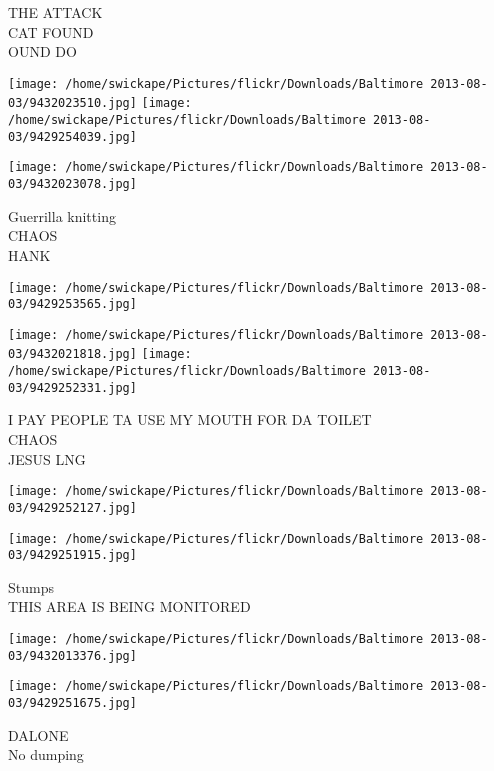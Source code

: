 \documentclass[10pt,letterpaper]{article}
\begin{document}
THE ATTACK\\
CAT FOUND\\
OUND DO\\
\pagebreak

\texttt{[image: /home/swickape/Pictures/flickr/Downloads/Baltimore 2013-08-03/9432023510.jpg]}
\texttt{[image: /home/swickape/Pictures/flickr/Downloads/Baltimore 2013-08-03/9429254039.jpg]}

\texttt{[image: /home/swickape/Pictures/flickr/Downloads/Baltimore 2013-08-03/9432023078.jpg]}

Guerrilla knitting\\
CHAOS\\
HANK\\
\pagebreak

\texttt{[image: /home/swickape/Pictures/flickr/Downloads/Baltimore 2013-08-03/9429253565.jpg]}

\vspace{0.25in}
\texttt{[image: /home/swickape/Pictures/flickr/Downloads/Baltimore 2013-08-03/9432021818.jpg]}
\texttt{[image: /home/swickape/Pictures/flickr/Downloads/Baltimore 2013-08-03/9429252331.jpg]}

I PAY PEOPLE TA USE MY MOUTH FOR DA TOILET\\
CHAOS\\
JESUS LNG\\
\pagebreak

\texttt{[image: /home/swickape/Pictures/flickr/Downloads/Baltimore 2013-08-03/9429252127.jpg]}

\vspace{0.25in}
\texttt{[image: /home/swickape/Pictures/flickr/Downloads/Baltimore 2013-08-03/9429251915.jpg]}

Stumps\\
THIS AREA IS BEING MONITORED\\
\pagebreak

\texttt{[image: /home/swickape/Pictures/flickr/Downloads/Baltimore 2013-08-03/9432013376.jpg]}

\vspace{0.25in}
\texttt{[image: /home/swickape/Pictures/flickr/Downloads/Baltimore 2013-08-03/9429251675.jpg]}

DALONE\\
No dumping\\
\pagebreak
\end{document}
